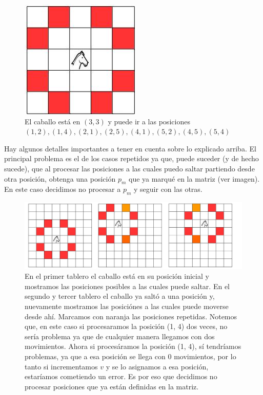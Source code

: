 \documentclass[a4paper]{article}
\begin{document}
\begin{figure}[h!]
\centering
\includegraphics[scale=0.5]{las8.jpg}\caption{El caballo está en $(3, 3)$ y puede ir a las posiciones $(1, 2), (1, 4), (2, 1), (2, 5), (4, 1), (5, 2), (4, 5), (5, 4)$}
\end{figure}

\vspace{0.3cm}
\noindent Hay algunos detalles importantes a tener en cuenta sobre lo explicado arriba. El principal problema es el de los casos repetidos ya que, puede suceder (y de hecho sucede), que al procesar las posiciones a las cuales puedo saltar partiendo desde otra posición, obtenga una posición $p_m$ que ya marqué en la matriz (ver imagen). En este caso decidimos no procesar a $p_m$ y seguir con las otras.

\begin{figure}[h!]
\centering
\includegraphics[scale=0.4]{las8repetidas.jpg}\caption{En el primer tablero el caballo está en su posición inicial y mostramos las posiciones posibles a las cuales puede saltar. En el segundo y tercer tablero el caballo ya saltó a una posición y, nuevamente mostramos las posiciónes a las cuales puede moverse desde ahí. Marcamos con naranja las posiciones repetidas. Notemos que, en este caso si procesaramos la posición (1, 4) dos veces, no sería problema ya que de cualquier manera llegamos con dos movimientos. Ahora si procesáramos la posición (1, 4), sí tendríamos problemas, ya que a esa posición se llega con 0 movimientos, por lo tanto si incrementamos $v$ y se lo asignamos a esa posición, estaríamos cometiendo un error. Es por eso que decidimos no procesar posiciones que ya están definidas en la matriz.}
\end{figure}
\end{document}
